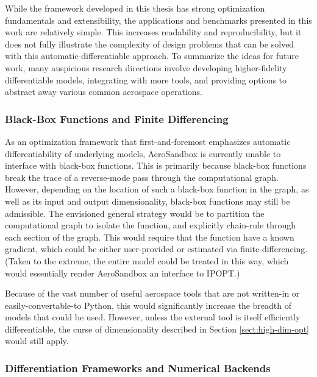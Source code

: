While the framework developed in this thesis has strong optimization fundamentals and extensibility, the applications and benchmarks presented in this work are relatively simple. This increases readability and reproducibility, but it does not fully illustrate the complexity of design problems that can be solved with this automatic-differentiable approach. To summarize the ideas for future work, many auspicious research directions involve developing higher-fidelity differentiable models, integrating with more tools, and providing options to abstract away various common aerospace operations.

\subsubsection{Black-Box Functions and Finite Differencing}
\label{sect:future-work-black-box}

As an optimization framework that first-and-foremost emphasizes automatic differentiability of underlying models, AeroSandbox is currently unable to interface with black-box functions. This is primarily because black-box functions break the trace of a reverse-mode pass through the computational graph. However, depending on the location of such a black-box function in the graph, as well as its input and output dimensionality, black-box functions may still be admissible. The envisioned general strategy would be to partition the computational graph to isolate the function, and explicitly chain-rule through each section of the graph. This would require that the function have a known gradient, which could be either user-provided or estimated via finite-differencing. (Taken to the extreme, the entire model could be treated in this way, which would essentially render AeroSandbox an interface to IPOPT.)

Because of the vast number of useful aerospace tools that are not written-in or easily-convertable-to Python, this would significantly increase the breadth of models that could be used. However, unless the external tool is itself efficiently differentiable, the curse of dimensionality described in Section \ref{sect:high-dim-opt} would still apply.


\subsubsection{Differentiation Frameworks and Numerical Backends}

